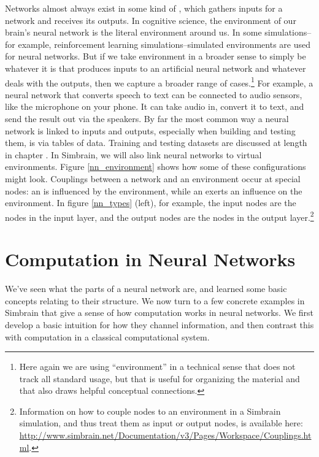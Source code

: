 Networks almost always exist in some kind of  , which gathers inputs for a network and receives its outputs. In cognitive science, the environment of our brain's neural network is the literal environment around us. In some simulations--for example, reinforcement learning simulations--simulated environments are used for neural networks. But if we take environment in a broader sense to simply be whatever it is that produces inputs to an artificial neural network and whatever deals with the outputs, then we capture a broader range of cases.\footnote{Here again we are using ``environment'' in a technical sense that does not track all standard usage, but that is useful for organizing the material and that also draws helpful conceptual connections.}  For example, a neural network that converts speech to text can be connected to audio sensors, like the microphone on your phone. It can take audio in, convert it to text, and send the result out via the speakers. By far the most common way a neural network is linked to inputs and outputs, especially when building and testing them, is via tables of data. Training and testing datasets are discussed at length in chapter . In Simbrain, we will also link neural networks to virtual environments. Figure \ref{nn_environment} shows how some of these configurations might look. Couplings between a network and an environment occur at special nodes:  an   is influenced by the environment, while an   exerts an influence on the environment. In figure \ref{nn_types} (left), for example, the input nodes are the nodes in the input layer, and the output nodes are the nodes in the output layer.\footnote{Information on how to couple nodes to an environment in a Simbrain simulation, and thus treat them as input or output nodes, is available here: \url{http://www.simbrain.net/Documentation/v3/Pages/Workspace/Couplings.html}.} 

\section{Computation in Neural Networks}\label{intro_comp_nn}

We've seen what the parts of a neural network are, and learned some basic concepts relating to their structure. We now turn to a few concrete examples in Simbrain that give a sense of how computation works in neural networks. We first develop a basic intuition for how they channel information, and then contrast this with computation in a classical computational system.

